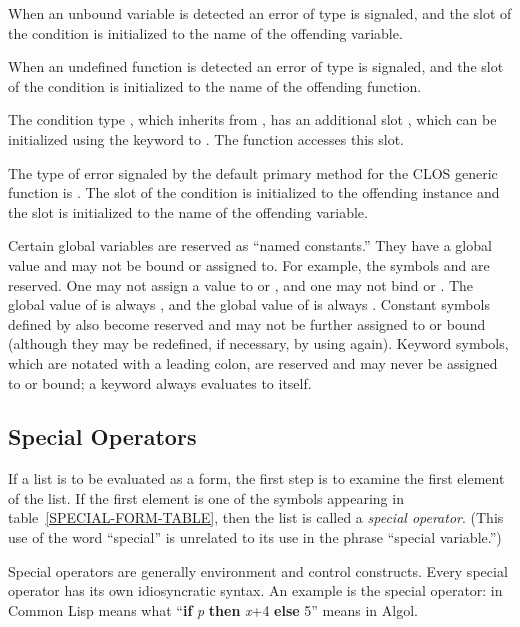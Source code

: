 When an unbound variable 
is detected an error of type  is signaled,
and the  slot of the
 condition is initialized to the name of the
offending variable.

When an undefined function
is detected an error of type  is signaled,
and the  slot of the
 condition is initialized to the name of the
offending function.

The condition type , which inherits from
, has an additional slot , which
can be initialized using the  keyword to .
The function  accesses this slot.

The type of error signaled by the default primary
method for the CLOS  generic function is .
The  slot
of the  condition is initialized to the offending instance
and the  slot is initialized
to the name of the offending variable.

Certain global variables are reserved as ``named constants.''
They have a global value and may not be bound or assigned to.
For example,
the symbols {\true} and {\false} are reserved.
One may not assign a value to {\true} or {\false},
and one may not bind {\true} or {\false}.  The global value of
{\true} is always {\true}, and the global value of
{\false} is always {\false}.  Constant symbols defined by
 also become reserved and may not be further
assigned to or bound (although they may be redefined, if necessary, by
using  again).  Keyword symbols,
which are notated with a leading colon, are reserved and
may never be assigned to or bound; a keyword always evaluates
to itself.

\subsection{Special Operators}

If a list is to be evaluated as a form, the first step is to examine
the first element of the list.  If the first element is one of
the symbols appearing in table~\ref{SPECIAL-FORM-TABLE},
then the list is called a \emph{special operator}.  (This use of the word
``special'' is unrelated to its use in the phrase ``special variable.'')

Special operators are generally environment and control constructs.
Every special operator has its own idiosyncratic syntax.  An example
is the  special operator:
 in Common Lisp means what
``\textbf{if} \emph{p} \textbf{then} \emph{x}+4 \textbf{else} 5'' means in
Algol.

